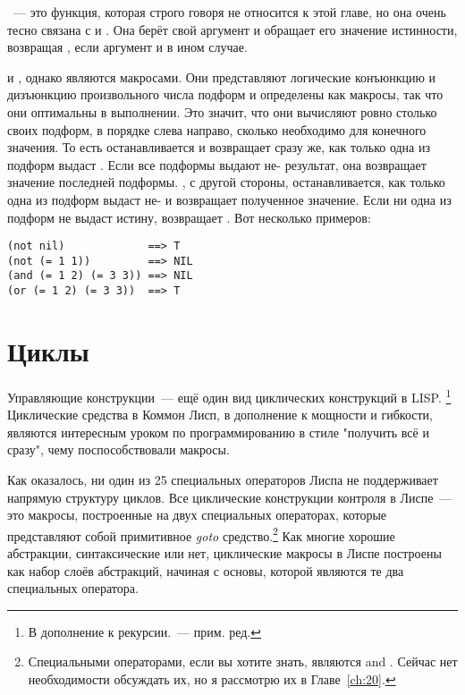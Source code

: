 ~--- это функция, которая строго говоря не относится к этой главе, но она очень
тесно связана с  и . Она берёт свой аргумент и обращает его значение
истинности, возвращая , если аргумент  и  в ином случае.

 и , однако являются макросами. Они представляют логические конъюнкцию
и дизъюнкцию произвольного числа подформ и определены как макросы, так что они оптимальны
в выполнении. Это значит, что они вычисляют ровно столько своих подформ, в порядке слева
направо, сколько необходимо для конечного значения. То есть  останавливается и
возвращает  сразу же, как только одна из подформ выдаст . Если все
подформы выдают не- результат, она возвращает значение последней
подформы. , с другой стороны, останавливается, как только одна из подформ выдаст
не- и возвращает полученное значение. Если ни одна из подформ не выдаст истину,
 возвращает . Вот несколько примеров:

\begin{lstlisting}
(not nil)             ==> T
(not (= 1 1))         ==> NIL
(and (= 1 2) (= 3 3)) ==> NIL
(or (= 1 2) (= 3 3))  ==> T
\end{lstlisting}

\section{Циклы}

Управляющие конструкции~--- ещё один вид циклических конструкций в LISP. \footnote{В
  дополнение к рекурсии.~--- прим. ред.} Циклические средства в Коммон Лисп, в дополнение к
мощности и гибкости, являются интересным уроком по программированию в стиле "получить всё
и сразу", чему поспособствовали макросы.

Как оказалось, ни один из 25 специальных операторов Лиспа не поддерживает напрямую
структуру циклов. Все циклические конструкции контроля в Лиспе~--- это макросы, построенные
на двух специальных операторах, которые представляют собой примитивное \textit{goto}
средство.\footnote{Специальными операторами, если вы хотите знать, являются 
  and . Сейчас нет необходимости обсуждать их, но я рассмотрю их в Главе~\ref{ch:20}.} Как
многие хорошие абстракции, синтаксические или нет, циклические макросы в Лиспе построены
как набор слоёв абстракций, начиная с основы, которой являются те два специальных
оператора.

